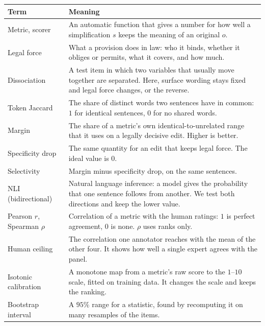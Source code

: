 \setlength{\tabcolsep}{4pt}
\begin{tabular}{@{}p{}p{}@{}}
\toprule
Term & Meaning \\
\midrule
Metric, scorer & An automatic function that gives a number for how well a simplification $s$ keeps the meaning of an original $o$. \\
Legal force & What a provision does in law: who it binds, whether it obliges or permits, what it covers, and how much. \\
Dissociation & A test item in which two variables that usually move together are separated. Here, surface wording stays fixed and legal force changes, or the reverse. \\
Token Jaccard & The share of distinct words two sentences have in common: $1$ for identical sentences, $0$ for no shared words. \\
Margin & The share of a metric's own identical-to-unrelated range that it uses on a legally decisive edit. Higher is better. \\
Specificity drop & The same quantity for an edit that keeps legal force. The ideal value is $0$. \\
Selectivity & Margin minus specificity drop, on the same sentences. \\
NLI (bidirectional) & Natural language inference: a model gives the probability that one sentence follows from another. We test both directions and keep the lower value. \\
Pearson $r$, Spearman $\rho$ & Correlation of a metric with the human ratings: $1$ is perfect agreement, $0$ is none. $\rho$ uses ranks only. \\
Human ceiling & The correlation one annotator reaches with the mean of the other four. It shows how well a single expert agrees with the panel. \\
Isotonic calibration & A monotone map from a metric's raw score to the $1$--$10$ scale, fitted on training data. It changes the scale and keeps the ranking. \\
Bootstrap interval & A $95\%$ range for a statistic, found by recomputing it on many resamples of the items. \\
\bottomrule
\end{tabular}
